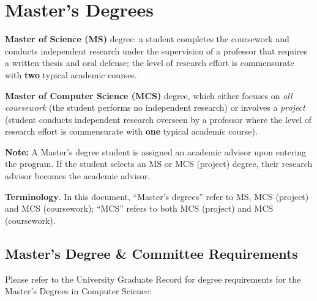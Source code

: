 
\hypertarget{masters-degrees}{%
\section{Master's Degrees}\label{masters-degrees}}

\textbf{Master of Science (MS)} degree: a student completes the coursework
and conducts independent research under the supervision of a professor that requires
a written thesis and oral defense; the level of research effort is
commensurate with \textbf{two} typical academic courses.

\textbf{Master of Computer Science (MCS)} degree, which either focuses
on \emph{all coursework} (the student performs no independent research)
or involves a \emph{project} (student conducts independent research
overseen by a professor where the level of research effort is
commensurate with \textbf{one} typical academic course).

\textbf{Note:} A Master's degree student is assigned an academic advisor
upon entering the program. If the student selects an MS or MCS
(project) degree, their research advisor becomes the academic
advisor.

\textbf{Terminology}. In this document, ``Master's degrees'' refer to
MS, MCS (project) and MCS (coursework); ``MCS'' refers to both MCS
(project) and MCS (coursework).

\hypertarget{masters-degree-requirements}{%
\subsection{Master's Degree \& Committee
Requirements}\label{masters-degree-requirements}}

Please refer to the University Graduate Record for
degree requirements for the Master's Degrees in Computer Science:


\makeatletter
    \newcommand*{\@MyTempTableTokens}{}%
    \newtoks\@tabtoks
    \newcommand\AddTableTokens[1]{\global\@tabtoks\expandafter{\the\@tabtoks#1}}
    \newcommand\eAddTableTokens[1]{%
        \protected@edef\@MyTempTableTokens{#1}%
        \expandafter\AddTableTokens\expandafter{\@MyTempTableTokens}%
    }
    \newcommand*\ResetTableTokens{\global\@tabtoks{}}
    \newcommand*\PrintTableTokens{\the\@tabtoks}
\makeatother


